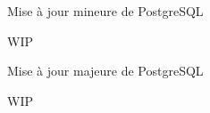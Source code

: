 
\begin{frame}[fragile]{Mise à jour mineure de PostgreSQL}

   WIP

\end{frame}


\begin{frame}[fragile]{Mise à jour majeure de PostgreSQL}

   WIP

\end{frame}

